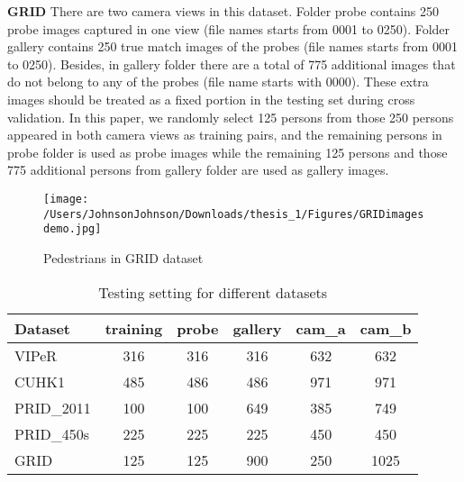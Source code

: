 \textbf{GRID} There are two camera views in this dataset. Folder probe contains 250 probe images captured in one view (file names starts from 0001  to 0250). Folder gallery contains 250 true match images of the probes (file names starts from 0001  to 0250). Besides, in gallery folder there are a total of 775 additional images that do not belong to any of the probes (file name starts with 0000). These extra images should be treated as a fixed portion in the testing set during cross validation. In this paper, we randomly select 125 persons from those 250 persons appeared in both camera views as training pairs, and the remaining persons in probe folder is used as probe images while  the remaining 125 persons and those 775 additional persons from gallery folder are used as gallery images. 
\begin{figure}[H]
\begin{raggedleft}
\texttt{[image: /Users/JohnsonJohnson/Downloads/thesis\_1/Figures/GRIDimagesdemo.jpg]}
\vspace{-3em}
\caption{Pedestrians in GRID dataset}
\end{raggedleft}
\end{figure}
\begin{table}[H]
\centering
\caption{Testing setting for different datasets}
\begin{tabular}{|l|c|c|c|c|c|}
\hline
Dataset&training&probe&gallery&cam\_a&cam\_b\\
\hline
VIPeR&316&316&316&632&632\\
\hline
CUHK1&485&486&486&971&971\\
\hline
PRID\_2011&100&100&649&385&749\\
\hline
PRID\_450s&225&225&225&450&450\\
\hline
GRID&125&125&900&250&1025\\
\hline
\end{tabular}\\ 
\end{table}
